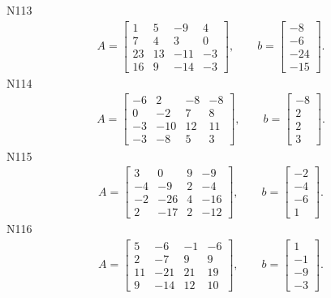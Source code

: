\documentclass[11pt]{report}
\begin{document}
N113
\begin{align*}
 A = \left[\begin{matrix}1 & 5 & -9 & 4\\7 & 4 & 3 & 0\\23 & 13 & -11 & -3\\16 & 9 & -14 & -3\end{matrix}\right],
\qquad b = \left[\begin{matrix}-8\\-6\\-24\\-15\end{matrix}\right]. 
 \end{align*}
N114
\begin{align*}
 A = \left[\begin{matrix}-6 & 2 & -8 & -8\\0 & -2 & 7 & 8\\-3 & -10 & 12 & 11\\-3 & -8 & 5 & 3\end{matrix}\right],
\qquad b = \left[\begin{matrix}-8\\2\\2\\3\end{matrix}\right]. 
 \end{align*}
N115
\begin{align*}
 A = \left[\begin{matrix}3 & 0 & 9 & -9\\-4 & -9 & 2 & -4\\-2 & -26 & 4 & -16\\2 & -17 & 2 & -12\end{matrix}\right],
\qquad b = \left[\begin{matrix}-2\\-4\\-6\\1\end{matrix}\right]. 
 \end{align*}
N116
\begin{align*}
 A = \left[\begin{matrix}5 & -6 & -1 & -6\\2 & -7 & 9 & 9\\11 & -21 & 21 & 19\\9 & -14 & 12 & 10\end{matrix}\right],
\qquad b = \left[\begin{matrix}1\\-1\\-9\\-3\end{matrix}\right]. 
 \end{align*}
\end{document}
